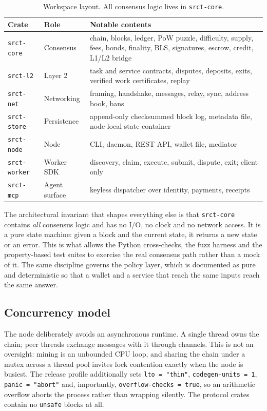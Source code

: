 \documentclass{article}
\begin{document}
\begin{table}[t]
\centering
\begin{tabular}{p{}p{}p{}}
\toprule
\textbf{Crate} & \textbf{Role} & \textbf{Notable contents} \\
\midrule
\texttt{srct-core} & Consensus & chain, blocks, ledger, PoW puzzle, difficulty,
  supply, fees, bonds, finality, BLS, signatures, escrow, credit, L1/L2 bridge \\
\texttt{srct-l2} & Layer 2 & task and service contracts, disputes, deposits,
  exits, verified work certificates, replay \\
\texttt{srct-net} & Networking & framing, handshake, messages, relay, sync,
  address book, bans \\
\texttt{srct-store} & Persistence & append-only checksummed block log, metadata
  file, node-local state container \\
\texttt{srct-node} & Node & CLI, daemon, REST API, wallet file, mediator \\
\texttt{srct-worker} & Worker SDK & discovery, claim, execute, submit, dispute,
  exit; client only \\
\texttt{srct-mcp} & Agent surface & keyless dispatcher over identity, payments,
  receipts \\
\bottomrule
\end{tabular}
\caption{Workspace layout. All consensus logic lives in \texttt{srct-core}.}
\label{tab:crates}
\end{table}

The architectural invariant that shapes everything else is that
\texttt{srct-core} contains \emph{all} consensus logic and has no I/O, no clock
and no network access. It is a pure state machine: given a block and the
current state, it returns a new state or an error. This is what allows the
Python cross-checks, the fuzz harness and the property-based test suites to
exercise the real consensus path rather than a mock of it. The same discipline
governs the policy layer, which is documented as pure and deterministic so that
a wallet and a service that reach the same inputs reach the same answer.

\subsection{Concurrency model}

The node deliberately avoids an asynchronous runtime. A single thread owns the
chain; peer threads exchange messages with it through channels. This is not an
oversight: mining is an unbounded CPU loop, and sharing the chain under a mutex
across a thread pool invites lock contention exactly when the node is busiest.
The release profile additionally sets \texttt{lto = "thin"},
\texttt{codegen-units = 1}, \texttt{panic = "abort"} and, importantly,
\texttt{overflow-checks = true}, so an arithmetic overflow aborts the process
rather than wrapping silently. The protocol crates contain no \texttt{unsafe}
blocks at all.
\end{document}
